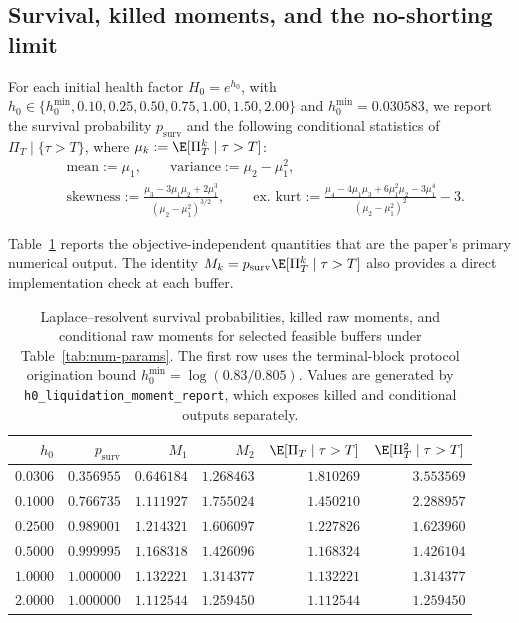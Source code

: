 \subsection{Survival, killed moments, and the no-shorting limit}

For each initial health factor $H_0=e^{h_0}$, with
$h_0\in\{h_0^{\min},0.10,0.25,0.50,0.75,1.00,1.50,2.00\}$ and
$h_0^{\min}=0.030583$, we report the survival
probability $p_{\mathrm{surv}}$ and the following conditional statistics of $\Pi_T\mid\{\tau>T\}$,
where $\mu_k:=\E[\Pi_T^k\mid\tau>T]$:
\begin{equation}\label{eq:stdmom}
\begin{aligned}
&\text{mean}:=\mu_1,\qquad
\text{variance}:=\mu_2-\mu_1^2,\\
&\text{skewness}:=\frac{\mu_3-3\mu_1\mu_2+2\mu_1^3}{(\mu_2-\mu_1^2)^{3/2}},\qquad
\text{ex.\ kurt}:=\frac{\mu_4-4\mu_1\mu_3+6\mu_1^2\mu_2-3\mu_1^4}{(\mu_2-\mu_1^2)^{2}}-3.
\end{aligned}
\end{equation}

Table~\ref{tab:killed-moments} reports the objective-independent quantities that are the
paper's primary numerical output. The identity
$M_k=p_{\mathrm{surv}}\E[\Pi_T^k\mid\tau>T]$ also provides a direct implementation
check at each buffer.

\begin{table}[ht]
\centering\small
\renewcommand{\arraystretch}{1.25}
\begin{tabular}{rrrrrr}
\toprule
$h_0$ & $p_{\mathrm{surv}}$ & $M_1$ & $M_2$
& $\E[\Pi_T\mid\tau>T]$ & $\E[\Pi_T^2\mid\tau>T]$ \\
\midrule
$0.0306$ & $0.356955$ & $0.646184$ & $1.268463$ & $1.810269$ & $3.553569$ \\
$0.1000$ & $0.766735$ & $1.111927$ & $1.755024$ & $1.450210$ & $2.288957$ \\
$0.2500$ & $0.989001$ & $1.214321$ & $1.606097$ & $1.227826$ & $1.623960$ \\
$0.5000$ & $0.999995$ & $1.168318$ & $1.426096$ & $1.168324$ & $1.426104$ \\
$1.0000$ & $1.000000$ & $1.132221$ & $1.314377$ & $1.132221$ & $1.314377$ \\
$2.0000$ & $1.000000$ & $1.112544$ & $1.259450$ & $1.112544$ & $1.259450$ \\
\bottomrule
\end{tabular}
\caption{Laplace--resolvent survival probabilities, killed raw moments, and conditional
raw moments for selected feasible buffers under Table~\ref{tab:num-params}. The first row
uses the terminal-block protocol origination bound $h_0^{\min}=\log(0.83/0.805)$. Values are generated by
\texttt{h0\_liquidation\_moment\_report}, which exposes killed and conditional outputs
separately.}
\label{tab:killed-moments}
\end{table}

